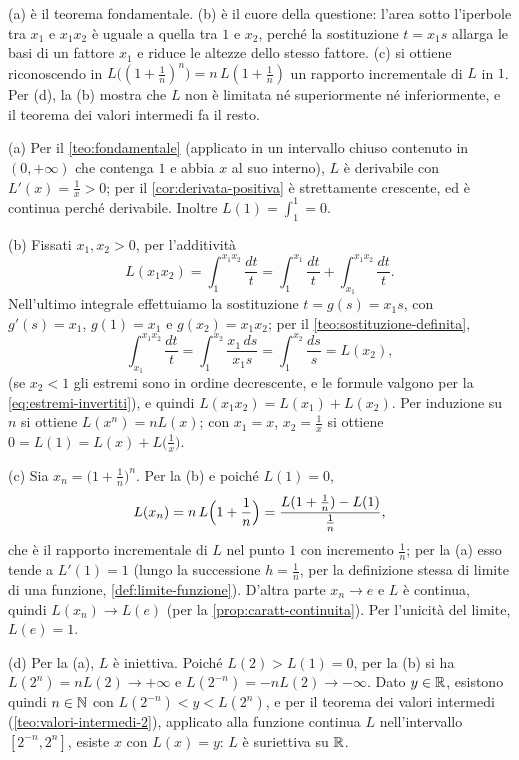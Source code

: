 \begin{schema}
\end{schema}

\begin{strategia}
(a) è il teorema fondamentale. (b) è il cuore della questione: l'area sotto l'iperbole tra
$x_{1}$ e $x_{1}x_{2}$ è uguale a quella tra $1$ e $x_{2}$, perché la sostituzione $t=x_{1}s$ allarga
le basi di un fattore $x_{1}$ e riduce le altezze dello stesso fattore. (c) si ottiene
riconoscendo in $L\bigl((1+\frac1n)^{n}\bigr)=n\,L(1+\frac1n)$ un rapporto incrementale di $L$ in $1$. Per (d),
la (b) mostra che $L$ non è limitata né superiormente né inferiormente, e il teorema dei
valori intermedi fa il resto.
\end{strategia}

\begin{dimostrazione}
(a) Per il \cref{teo:fondamentale} (applicato in un intervallo chiuso contenuto in
$(0,+\infty)$ che contenga $1$ e abbia $x$ al suo interno), $L$ è derivabile con
$L'(x)=\frac1x>0$; per il
\cref{cor:derivata-positiva} è strettamente crescente, ed è continua perché derivabile.
Inoltre $L(1)=\int_{1}^{1}=0$.

(b) Fissati $x_{1},x_{2}>0$, per l'additività
\[
  L(x_{1}x_{2})=\int_{1}^{x_{1}x_{2}}\frac{dt}t=\int_{1}^{x_{1}}\frac{dt}t+\int_{x_{1}}^{x_{1}x_{2}}\frac{dt}t .
\]
Nell'ultimo integrale effettuiamo la sostituzione $t=g(s)=x_{1}s$, con $g'(s)=x_{1}$,
$g(1)=x_{1}$ e $g(x_{2})=x_{1}x_{2}$; per il \cref{teo:sostituzione-definita},
\[
  \int_{x_{1}}^{x_{1}x_{2}}\frac{dt}t=\int_{1}^{x_{2}}\frac{x_{1}\,ds}{x_{1}s}=\int_{1}^{x_{2}}\frac{ds}s=L(x_{2}) ,
\]
(se $x_{2}<1$ gli estremi sono in ordine decrescente, e le formule valgono per la
\eqref{eq:estremi-invertiti}), e quindi $L(x_{1}x_{2})=L(x_{1})+L(x_{2})$. Per induzione su $n$ si ottiene $L(x^{n})=nL(x)$; con
$x_{1}=x$, $x_{2}=\frac1x$ si ottiene $0=L(1)=L(x)+L\bigl(\frac1x\bigr)$.

(c) Sia $x_{n}=\bigl(1+\frac1n\bigr)^{n}$. Per la (b) e poiché $L(1)=0$,
\[
  L(x_{n})=n\,L\Bigl(1+\frac1n\Bigr)=\frac{L(1+\frac1n)-L(1)}{\frac1n} ,
\]
che è il rapporto incrementale di $L$ nel punto $1$ con incremento $\frac1n$; per la (a) esso
tende a $L'(1)=1$ (lungo la successione $h=\frac1n$, per la definizione stessa di limite di una
funzione, \cref{def:limite-funzione}). D'altra parte $x_{n}\to e$ e $L$ è continua, quindi $L(x_{n})\to L(e)$ (per la
\cref{prop:caratt-continuita}). Per l'unicità del limite, $L(e)=1$.

(d) Per la (a), $L$ è iniettiva. Poiché $L(2)>L(1)=0$, per la (b) si ha $L(2^{n})=nL(2)\to+\infty$
e $L(2^{-n})=-nL(2)\to-\infty$. Dato $y\in\mathbb{R}$, esistono quindi $n\in\mathbb{N}$ con $L(2^{-n})<y<L(2^{n})$, e
per il teorema dei valori intermedi (\cref{teo:valori-intermedi-2}), applicato alla funzione
continua $L$ nell'intervallo $[2^{-n},2^{n}]$, esiste $x$ con $L(x)=y$: $L$ è suriettiva su $\mathbb{R}$.
\end{dimostrazione}

